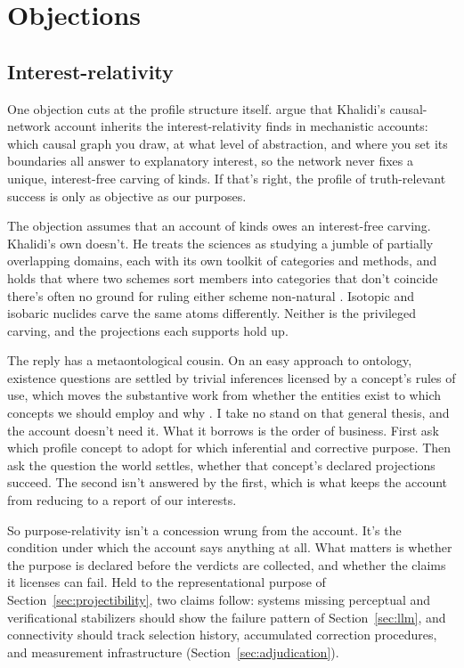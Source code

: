 \documentclass[12pt]{article}
\begin{document}
\section{Objections}\label{sec:objections}

\subsection{Interest-relativity}

One objection cuts at the profile structure itself. \textcite{onishi_serpico_2022} argue that
Khalidi's causal-network account inherits the interest-relativity \textcite{craver_2009}
finds in mechanistic accounts: which causal graph you draw, at what level of
abstraction, and where you set its boundaries all answer to explanatory interest, so the
network never fixes a unique, interest-free carving of kinds. If that's right, the
profile of truth-relevant success is only as objective as our purposes.

The objection assumes that an account of kinds owes an interest-free carving. Khalidi's
own doesn't. He treats the sciences as studying a jumble of partially overlapping domains,
each with its own toolkit of categories and methods, and holds that where two schemes sort
members into categories that don't coincide there's often no ground for ruling either
scheme non-natural \citep{khalidi2013}. Isotopic and isobaric nuclides carve the same atoms
differently. Neither is the privileged carving, and the projections each supports hold up.

The reply has a metaontological cousin. On an easy approach to ontology, existence
questions are settled by trivial inferences licensed by a concept's rules of use, which
moves the substantive work from whether the entities exist to which concepts we should
employ and why \citep{thomasson2015ontologyMadeEasy}. I take no stand on that general
thesis, and the account doesn't need it. What it borrows is the order of business. First
ask which profile concept to adopt for which inferential and corrective purpose. Then ask
the question the world settles, whether that concept's declared projections succeed. The
second isn't answered by the first, which is what keeps the account from reducing to a
report of our interests.

So purpose-relativity isn't a concession wrung from the account. It's the condition under
which the account says anything at all. What matters is whether the purpose is declared
before the verdicts are collected, and whether the claims it licenses can fail. Held to
the representational purpose of Section~\ref{sec:projectibility}, two claims follow:
systems missing perceptual and verificational stabilizers should show the failure pattern
of Section~\ref{sec:llm}, and connectivity should track selection history, accumulated
correction procedures, and measurement infrastructure (Section~\ref{sec:adjudication}).
\end{document}
